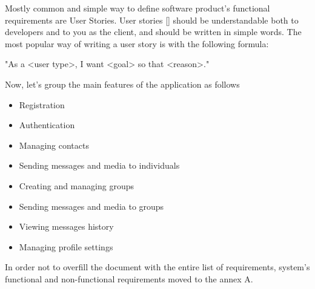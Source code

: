 Mostly common and simple way to define software product's functional requirements are User Stories.
User stories [\cite{cohn2004user}] should be understandable both to developers and to you as the client, and should be written in simple words.
The most popular way of writing a user story is with the following formula:

\begin{center}
    \begin{spverbatim}
        "As a <user type>, I want <goal> so that <reason>."
    \end{spverbatim}
\end{center}

Now, let's group the main features of the application as follows

\begin{itemize}
    \item Registration
    \item Authentication
    \item Managing contacts
    \item Sending messages and media to individuals
    \item Creating and managing groups
    \item Sending messages and media to groups
    \item Viewing messages history
    \item Managing profile settings
\end{itemize}

In order not to overfill the document with the entire list of requirements, system's functional and non-functional
requirements moved to the annex A.
